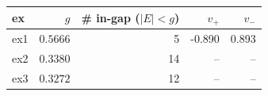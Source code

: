 \begin{tabular}{@{}lrrrr@{}}
\toprule
ex & $g$ & \# in-gap ($|E|<g$) & $v_{+}$ & $v_{-}$ \\
\midrule
ex1 & $0.5666$ & 5 & -0.890 & 0.893 \\
ex2 & $0.3380$ & 14 & -- & -- \\
ex3 & $0.3272$ & 12 & -- & -- \\
\bottomrule
\end{tabular}
